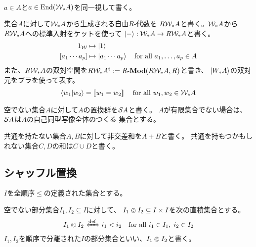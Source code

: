 {\begin{description}
\begin{equation*}
\begin{split}
		\end{split}\end{equation*}
		$a\in A$と$a\in {\ensuremath{\operatorname{End}}}({{\mathcal{W}}}_*A)$を同一視して書く。
		\item[自由代数] 集合$A$に対して${{\mathcal{W}}}_*A$から生成される自由$R$-代数を
		$R{{\mathcal{W}}}_*A$と書く。${{\mathcal{W}}}_*A$から$R{{\mathcal{W}}}_*A$への標準入射をケットを使って
		$\mathinner{|{-}\rangle}:{{\mathcal{W}}}_*A\to R{{\mathcal{W}}}_*A$と書く。
		\begin{equation*}\begin{split}
				1_{{\mathcal{W}}} &\mapsto \mathinner{|{1}\rangle} \\
				[a_1\cdots a_p] &\mapsto \mathinner{|{a_1\cdots a_p}\rangle}
				\quad\text{for all } a_1,\dots,a_p\in A
		\end{split}\end{equation*}
		また、$R{{\mathcal{W}}}_*A$の双対空間を$R\W_*A^\tran:=\Mod{R}(R\W_*A,R)$と書き、
		$\mathinner{|{W_*A}\rangle}$の双対元をブラを使って表す。
		\begin{equation*}\begin{split}
			\mathinner{\langle{w_1|w_2}\rangle} = [\![w_1 = w_2]\!]\;
			\quad\text{for all } w_1,w_2\in {\ensuremath{{\mathcal{W}}}}_*A
		\end{split}\end{equation*}
		\item[置換群] 空でない集合$A$に対して$A$の置換群を${{\mathcal{S}}} A$と書く。
		$A$が有限集合でない場合は、${{\mathcal{S}}} A$は$A$の自己同型写像全体のつくる
		集合とする。
		\item[非交差和] 共通を持たない集合$A,B$に対して非交差和を$A+B$と書く。
		共通を持もつかもしれない集合$C,D$の和は$C\cup D$と書く。
	\end{description} %

\subsection{シャッフル置換}\label{s2:シャッフル置換} %
	$I$を全順序$\le$の定義された集合とする。

	\begin{definition}[順序で分離された部分集合]
	\label{def:順序で分離された部分集合} %
		空でない部分集合$I_1,I_2\subseteq I$に対して、
		$I_1\olessthan I_2\subseteq I\times I$を次の直積集合とする。
		\begin{equation*}\begin{split}
			I_1\oless I_2 \xIff{\dfn} 
				i_1 < i_2 \quad\text{for all } i_1\in I_1,\; i_2\in I_2
		\end{split}\end{equation*}
		$I_1,I_2$を順序で分離された$I$の部分集合といい、$I_1\olessthan I_2$と書く。
	\end{definition} %

}
